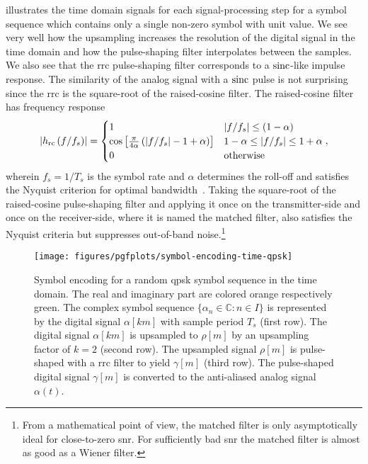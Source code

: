  illustrates the time domain signals for each signal-processing step for a symbol sequence which contains only a single non-zero symbol with unit value.
We see very well how the upsampling increases the resolution of the digital signal in the time domain and how the pulse-shaping filter interpolates between the samples.
We also see that the \gls{rrc} pulse-shaping filter corresponds to a $\sinc$-like impulse response.
The similarity of the analog signal with a $\sinc$ pulse is not surprising since the \gls{rrc} is the square-root of the raised-cosine filter.
The raised-cosine filter has frequency response
\begin{equation}
	\abs{h_\text{rc}\left(f/f_s\right)}
	=
	\begin{cases}
		1 & \abs*{f/f_s}\leq(1-\alpha) \\
		\cos\left[\frac{\pi}{4\alpha}\left(\abs*{f/f_s}-1+\alpha\right)\right] & 1-\alpha\leq\abs*{f/f_s}\leq1+\alpha \\
		0 & \text{otherwise}
	\end{cases}
	,
\end{equation}
wherein $f_s=1/T_s$ is the symbol rate and $\alpha$ determines the roll-off and satisfies the Nyquist criterion for optimal bandwidth~\cite[p.~51]{Madhow2008}.
Taking the square-root of the raised-cosine pulse-shaping filter and applying it once on the transmitter-side and once on the receiver-side, where it is named the matched filter, also satisfies the Nyquist criteria but suppresses out-of-band noise.\footnote{From a mathematical point of view, the matched filter is only asymptotically ideal for close-to-zero \gls{snr}. For sufficiently bad \gls{snr} the matched filter is almost as good as a Wiener filter.}
\begin{figure}[htb]
	\centering
	\texttt{[image: figures/pgfplots/symbol-encoding-time-qpsk]}
	\caption{Symbol encoding for a random \gls{qpsk} symbol sequence in the time domain. The real and imaginary part are colored orange respectively green. The complex symbol sequence $\{\alpha_n\in\mathbb{C}\colon n\in I\}$ is represented by the digital signal $\alpha[km]$ with sample period $T_s$ (first row). The digital signal $\alpha[km]$ is upsampled to $\rho[m]$ by an upsampling factor of $k=2$ (second row). The upsampled signal $\rho[m]$ is pulse-shaped with a \gls{rrc} filter to yield $\gamma[m]$ (third row). The pulse-shaped digital signal $\gamma[m]$ is converted to the anti-aliased analog signal $\alpha(t)$.}\label{fig:baseband_construction_rand_time}
\end{figure}
